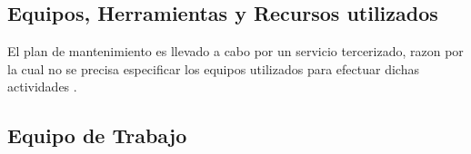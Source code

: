 

\subsection{Equipos, Herramientas y Recursos utilizados}

El plan de mantenimiento es llevado a cabo por un servicio  tercerizado, razon por la cual no se precisa especificar los equipos utilizados para efectuar dichas actividades . 






%
%
%
%





\subsection{Equipo de Trabajo}


